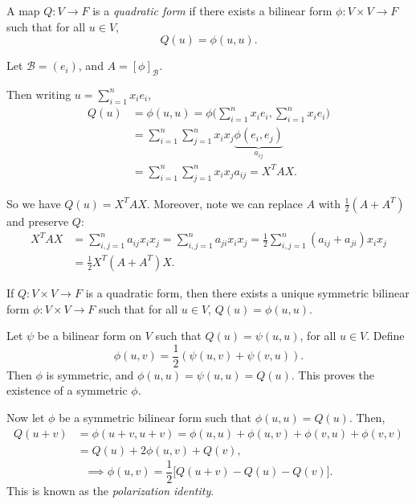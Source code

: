 \documentclass[12pt]{article}
\begin{document}
\begin{definition}
	A map $Q : V \to F$ is a \textit{quadratic form} if there exists a bilinear form $\phi : V \times V \to F$ such that for all $u \in V$,
	\[
		Q(u) = \phi(u, u)
	.\]
\end{definition}
\begin{remark}
	Let $\mathcal{B} = (e_i)$, and $A = [\phi]_{\mathcal{B}}$.

	Then writing $u = \sum_{i = 1}^{n} x_i e_i$,
	\begin{align*}
		Q(u) &= \phi(u, u) = \phi \Biggl( \sum_{i = 1}^{n} x_i e_i, \sum_{i = 1}^{n} x_i e_i \Biggr) \\
		     &= \sum_{i = 1}^{n} \sum_{j = 1}^{n} x_i x_j \underbrace{\phi(e_i, e_j)}_{a_{ij}} \\
		     &= \sum_{i = 1}^{n} \sum_{j = 1}^{n} x_i x_j a_{ij} = X^{T}AX.
	\end{align*}

	So we have $Q(u) = X^{T}AX$. Moreover, note we can replace $A$ with $\frac{1}{2}(A + A^{T})$ and preserve $Q$:
	\begin{align*}
		X^{T}AX &= \sum_{i,j = 1}^{n} a_{ij} x_i x_j = \sum_{i,j = 1}^{n} a_{ji}x_i x_j = \frac{1}{2} \sum_{i,j = 1}^{n} (a_{ij} + a_{ji})x_i x_j \\
			&= \frac{1}{2}X^{T}(A + A^{T})X.
	\end{align*}
\end{remark}

\begin{proposition}
	If $Q : V \times V \to F$ is a quadratic form, then there exists a unique symmetric bilinear form $\phi : V \times V \to F$ such that for all $u \in V$, $Q(u) = \phi(u, u)$.
\end{proposition}

\begin{proofbox}
	Let $\psi$ be a bilinear form on $V$ such that $Q(u) = \psi(u, u)$, for all $u \in V$. Define
	 \[
		 \phi(u, v) = \frac{1}{2}(\psi(u, v) + \psi(v,u))
	.\]
	Then $\phi$ is symmetric, and $\phi(u, u) = \psi(u, u) = Q(u)$. This proves the existence of a symmetric $\phi$.

	Now let $\phi$ be a symmetric bilinear form such that $\phi(u, u) = Q(u)$. Then,
	\begin{align*}
		Q(u + v) &= \phi(u + v, u + v) = \phi(u, u) + \phi(u, v) + \phi(v, u) + \phi(v, v) \\
			 &= Q(u) + 2 \phi(u, v) + Q(v),
	\end{align*}
	\[
		\implies \phi(u, v) = \frac{1}{2} \bigl[Q(u+v) - Q(u) - Q(v)\bigr]
	.\]
	This is known as the \textit{polarization identity}.
\end{proofbox}
\end{document}

